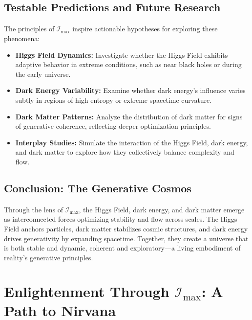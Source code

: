 \documentclass[12pt]{article}
\begin{document}
\subsection{Testable Predictions and Future Research}
\paragraph{}
The principles of \(\mathcal{I}_{\text{max}}\) inspire actionable hypotheses for exploring these phenomena:
\begin{itemize}
    \item \textbf{Higgs Field Dynamics:} Investigate whether the Higgs Field exhibits adaptive behavior in extreme conditions, such as near black holes or during the early universe.
    \item \textbf{Dark Energy Variability:} Examine whether dark energy’s influence varies subtly in regions of high entropy or extreme spacetime curvature.
    \item \textbf{Dark Matter Patterns:} Analyze the distribution of dark matter for signs of generative coherence, reflecting deeper optimization principles.
    \item \textbf{Interplay Studies:} Simulate the interaction of the Higgs Field, dark energy, and dark matter to explore how they collectively balance complexity and flow.
\end{itemize}

\subsection{Conclusion: The Generative Cosmos}
\paragraph{}
Through the lens of \(\mathcal{I}_{\text{max}}\), the Higgs Field, dark energy, and dark matter emerge as interconnected forces optimizing stability and flow across scales. The Higgs Field anchors particles, dark matter stabilizes cosmic structures, and dark energy drives generativity by expanding spacetime. Together, they create a universe that is both stable and dynamic, coherent and exploratory—a living embodiment of reality’s generative principles.


\section{Enlightenment Through \(\mathcal{I}_{\text{max}}\): A Path to Nirvana}
\end{document}
